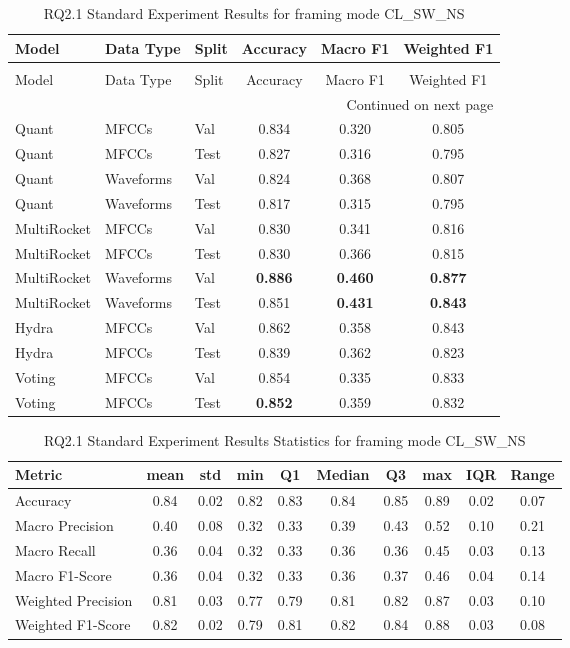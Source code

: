 \begin{longtable}{|l|l|l|c|c|c|}
\caption{RQ2.1 Standard Experiment Results for framing mode CL\_SW\_NS} \label{tab:rq2.1_Standard_Results} \\
\toprule
Model & Data Type & Split & Accuracy & Macro F1 & Weighted F1 \\
\midrule
\endfirsthead
\caption[]{RQ2.1 Standard Experiment Results for framing mode CL\_SW\_NS} \\
\toprule
Model & Data Type & Split & Accuracy & Macro F1 & Weighted F1 \\
\midrule
\endhead
\midrule
\multicolumn{6}{r}{Continued on next page} \\
\midrule
\endfoot
\bottomrule
\endlastfoot
Quant & MFCCs & Val & 0.834 & 0.320 & 0.805 \\
Quant & MFCCs & Test & 0.827 & 0.316 & 0.795 \\
Quant & Waveforms & Val & 0.824 & 0.368 & 0.807 \\
Quant & Waveforms & Test & 0.817 & 0.315 & 0.795 \\
MultiRocket & MFCCs & Val & 0.830 & 0.341 & 0.816 \\
MultiRocket & MFCCs & Test & 0.830 & 0.366 & 0.815 \\
MultiRocket & Waveforms & Val & \textbf{0.886} & \textbf{0.460} & \textbf{0.877} \\
MultiRocket & Waveforms & Test & 0.851 & \textbf{0.431} & \textbf{0.843} \\
Hydra & MFCCs & Val & 0.862 & 0.358 & 0.843 \\
Hydra & MFCCs & Test & 0.839 & 0.362 & 0.823 \\
Voting & MFCCs & Val & 0.854 & 0.335 & 0.833 \\
Voting & MFCCs & Test & \textbf{0.852} & 0.359 & 0.832 \\
\end{longtable}

\begin{table}[h]
\caption{RQ2.1 Standard Experiment Results Statistics for framing mode CL\_SW\_NS}
\label{tab:rq2.1_Standard_Results_Statistics}
\begin{tabular}{|l|c|c|c|c|c|c|c|c|c|}
\toprule
Metric & mean & std & min & Q1 & Median & Q3 & max & IQR & Range \\
\midrule
Accuracy & 0.84 & 0.02 & 0.82 & 0.83 & 0.84 & 0.85 & 0.89 & 0.02 & 0.07 \\
Macro Precision & 0.40 & 0.08 & 0.32 & 0.33 & 0.39 & 0.43 & 0.52 & 0.10 & 0.21 \\
Macro Recall & 0.36 & 0.04 & 0.32 & 0.33 & 0.36 & 0.36 & 0.45 & 0.03 & 0.13 \\
Macro F1-Score & 0.36 & 0.04 & 0.32 & 0.33 & 0.36 & 0.37 & 0.46 & 0.04 & 0.14 \\
Weighted Precision & 0.81 & 0.03 & 0.77 & 0.79 & 0.81 & 0.82 & 0.87 & 0.03 & 0.10 \\
Weighted F1-Score & 0.82 & 0.02 & 0.79 & 0.81 & 0.82 & 0.84 & 0.88 & 0.03 & 0.08 \\
\bottomrule
\end{tabular}
\end{table}